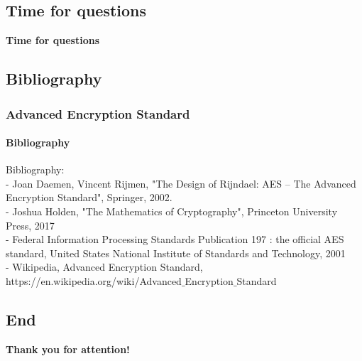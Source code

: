 \subsection{Time for questions}
\begin{frame}
	
	\begin{center}
		\Huge \textbf{Time for questions}
	\end{center}

\end{frame}
\subsection{Bibliography}
\begin{frame}
	\frametitle{Advanced Encryption Standard}
		\framesubtitle{Bibliography}
	{\normalsize 
	
	Bibliography:\\	
	\vspace{0,2cm}
{- Joan Daemen, Vincent Rijmen, "The Design of Rijndael: AES – The Advanced Encryption Standard", Springer, 2002.}\\
\vspace{0,2cm}
{- Joshua Holden, "The Mathematics of Cryptography", Princeton University Press, 2017}\\
\vspace{0,2cm}
{- Federal Information Processing Standards Publication 197 : the official AES standard, United States National Institute of Standards and Technology, 2001}\\
\vspace{0,2cm}
{- Wikipedia, Advanced Encryption Standard, https://en.wikipedia.org/wiki/Advanced$\_$Encryption$\_$Standard}\\

	}
\end{frame}

\subsection{End}
\begin{frame}
	
	\begin{center}
		\Huge \textbf{Thank you for attention!}
	\end{center}

\end{frame}
